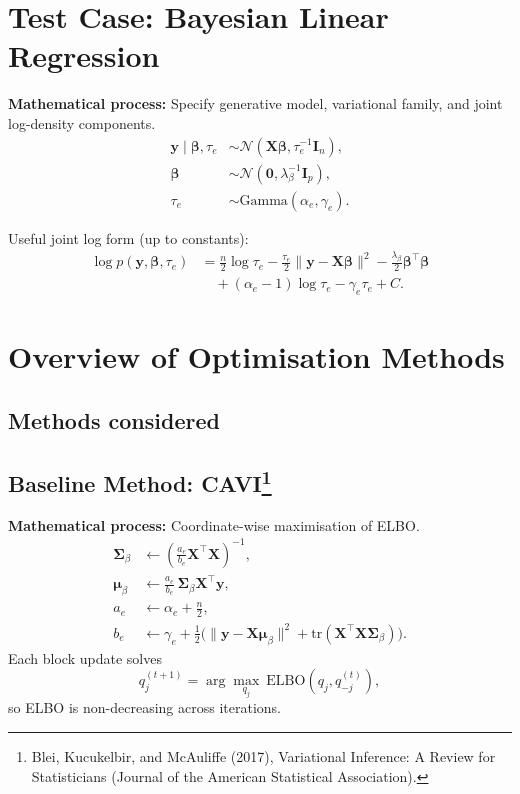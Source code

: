 \documentclass[11pt]{article}
\newcommand{\N}{\mathcal{N}}
\newcommand{\ELBO}{\mathrm{ELBO}}
\newcommand{\tr}{\mathrm{tr}}
\begin{document}
\section*{Test Case: Bayesian Linear Regression}

\textbf{Mathematical process:} Specify generative model, variational family, and joint log-density components.
\begin{align}
\bm y\mid\bm\beta,\tau_e &\sim \N(\bm X\bm\beta,\tau_e^{-1}\bm I_n),\\
\bm\beta &\sim \N(\bm 0,\lambda_\beta^{-1}\bm I_p),\\
\tau_e &\sim \mathrm{Gamma}(\alpha_e,\gamma_e).
\end{align}

Useful joint log form (up to constants):
\begin{align}
\log p(\bm y,\bm\beta,\tau_e)
&= \frac{n}{2}\log\tau_e
-\frac{\tau_e}{2}\|\bm y-\bm X\bm\beta\|^2
-\frac{\lambda_\beta}{2}\bm\beta^\top\bm\beta \\
&\quad +(\alpha_e-1)\log\tau_e-\gamma_e\tau_e + C.
\end{align}

\section*{Overview of Optimisation Methods}

\subsection*{Methods considered}


\subsection*{Baseline Method: CAVI\footnote{Blei, Kucukelbir, and McAuliffe (2017), Variational Inference: A Review for Statisticians (Journal of the American Statistical Association).}}

\textbf{Mathematical process:} Coordinate-wise maximisation of ELBO.
\begin{align}
\bm\Sigma_\beta &\leftarrow \left(\frac{a_e}{b_e}\bm X^\top\bm X\right)^{-1},\\
\bm\mu_\beta &\leftarrow \frac{a_e}{b_e}\,\bm\Sigma_\beta\bm X^\top\bm y,\\
a_e &\leftarrow \alpha_e+\frac n2,\\
b_e &\leftarrow \gamma_e+\frac12\Big(\|\bm y-\bm X\bm\mu_\beta\|^2+\tr(\bm X^\top\bm X\bm\Sigma_\beta)\Big).
\end{align}
Each block update solves
\begin{equation}
q_j^{(t+1)} = \arg\max_{q_j}\ \ELBO(q_j,q_{-j}^{(t)}),
\end{equation}
so ELBO is non-decreasing across iterations.
\end{document}
